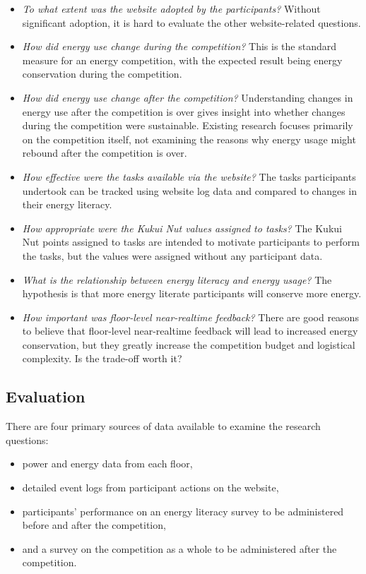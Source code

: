 \begin{itemize}
	\item \emph{To what extent was the website adopted by the participants?} Without significant adoption, it is hard to evaluate the other website-related questions.
	\item \emph{How did energy use change during the competition?} This is the standard measure for an energy competition, with the expected result being energy conservation during the competition.
	\item \emph{How did energy use change after the competition?} Understanding changes in energy use after the competition is over gives insight into whether changes during the competition were sustainable. Existing research focuses primarily on the competition itself, not examining the reasons why energy usage might rebound after the competition is over.
	\item \emph{How effective were the tasks available via the website?} The tasks participants undertook can be tracked using website log data and compared to changes in their energy literacy.
	\item \emph{How appropriate were the Kukui Nut values assigned to tasks?} The Kukui Nut points assigned to tasks are intended to motivate participants to perform the tasks, but the values were assigned without any participant data.
	\item \emph{What is the relationship between energy literacy and energy usage?} The hypothesis is that more energy literate participants will conserve more energy.
	\item \emph{How important was floor-level near-realtime feedback?} There are good reasons to believe that floor-level near-realtime feedback will lead to increased energy conservation, but they greatly increase the competition budget and logistical complexity. Is the trade-off worth it?
\end{itemize}

\subsection{Evaluation}
There are four primary sources of data available to examine the research questions:

\begin{itemize}
	\item power and energy data from each floor,
	\item detailed event logs from participant actions on the website,
	\item participants' performance on an energy literacy survey to be administered before and after the competition,
	\item and a survey on the competition as a whole to be administered after the competition.
\end{itemize}


